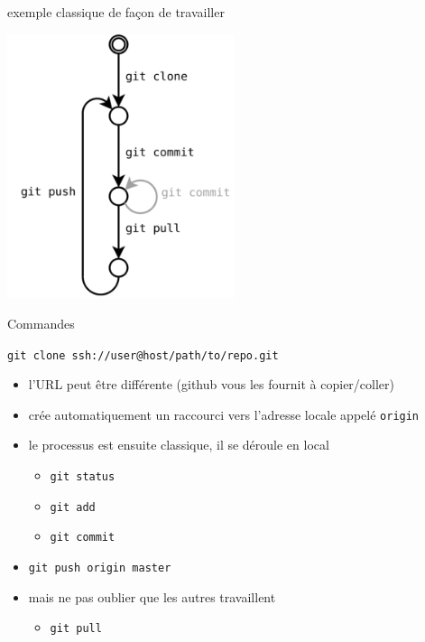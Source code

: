 \begin{frame}{%
\protect\hypertarget{exemple-classique-de-fauxe7on-de-travailler}{%
exemple classique de façon de travailler}}

\includegraphics[width=0.5\textwidth]{images/centralise-typique.png}

\end{frame}

\begin{frame}[fragile]{%
\protect\hypertarget{commandes}{%
Commandes}}

\texttt{git\ clone\ ssh://user@host/path/to/repo.git}

\begin{itemize}
\tightlist
\item
  l’URL peut être différente (github vous les fournit à copier/coller)
\item
  crée automatiquement un raccourci vers l’adresse locale appelé
  \texttt{origin}
\item
  le processus est ensuite classique, il se déroule en local

  \begin{itemize}
  \tightlist
  \item
    \texttt{git\ status}
  \item
    \texttt{git\ add}
  \item
    \texttt{git\ commit}
  \end{itemize}
\item
  \texttt{git\ push\ origin\ master}
\item
  mais ne pas oublier que les autres travaillent

  \begin{itemize}
  \tightlist
  \item
    \texttt{git\ pull}
  \end{itemize}
\end{itemize}

\end{frame}


